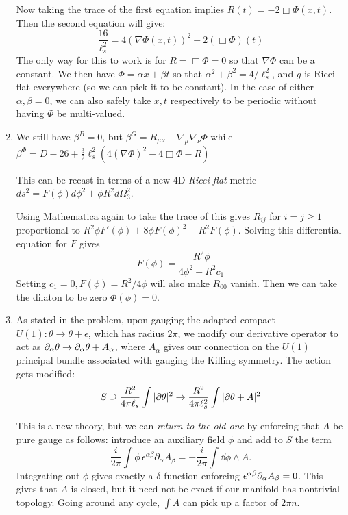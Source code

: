 \documentclass[11pt, class=article, crop=false]{standalone}
\begin{document}
\begin{enumerate}
	Now taking the trace of the first equation implies $R(t) = -2 \Box \Phi(x, t)$. Then the second equation will give:
	\[
		\frac{16}{\ell_s^2} =  4(\nabla \Phi(x, t))^2 - 2 (\Box \Phi)(t)
	\]
	The only way for this to work is for $R= \Box \Phi = 0$ so that $\nabla \Phi$ can be a constant. We then have $\Phi = \alpha x + \beta t$ so that $\alpha^2 + \beta^2 = 4/\ell_s^2$, and $g$ is Ricci flat everywhere (so we can pick it to be constant). In the case of either $\alpha, \beta = 0$, we can also safely take $x, t$ respectively to be periodic without having $\Phi$ be multi-valued.
	
	\item We still have $\beta^B = 0$, but $\beta^{G} = R_{\mu \nu} - \nabla_{\mu} \nabla_{\nu} \Phi$ while $\beta^\Phi = D - 26 +  \frac32 \ell_s^2 ( 4 (\nabla \Phi)^2 - 4 \Box \Phi - R)$
	
	This can be recast in terms of a new 4D \emph{Ricci flat} metric $ds^2 = F(\phi) d\phi^2 + \phi R^2 d\Omega_3^2$. 
	
	Using Mathematica again to take the trace of this gives $R_{ij}$ for $i=j\geq 1$ proportional to $R^2 \phi F'(\phi) + 8 \phi F(\phi)^2 - R^2 F(\phi)$. Solving this differential equation for $F$ gives
	\[
		F(\phi) = \frac{R^2 \phi}{4 \phi^2 + R^2 c_1}
	\]
	Setting $c_1 = 0, F(\phi) = R^2 / 4 \phi$ will also make $R_{00}$ vanish. Then we can take the dilaton to be zero $\Phi(\phi) = 0$.
	
	\item As stated in the problem, upon gauging the adapted compact $U(1): \theta \to \theta + \epsilon$, which has radius $2\pi$, we modify our derivative operator to act as $\partial_\alpha \theta \to \partial_\alpha \theta + A_\alpha$, where $A_\alpha$ gives our connection on the $U(1)$ principal bundle associated with gauging the Killing symmetry. The action gets modified:
	\[
		S \supseteq \frac{R^2}{4\pi \ell_s} \int |\partial \theta|^2 \to \frac{R^2}{4\pi \ell_s^2} \int |\partial \theta + A|^2
	\]
	
	This is a new theory, but we can \emph{return to the old one} by enforcing that $A$ be pure gauge as follows: introduce an auxiliary field $\phi$ and add to $S$ the term 
	\[
		\frac{i}{2\pi} \int \phi\, \epsilon^{\alpha \beta} \partial_{\alpha} A_{\beta} = - \frac{i}{2\pi} \int \dd \phi \wedge A.
	\]
	 Integrating out $\phi$ gives exactly a $\delta$-function enforcing $\epsilon^{\alpha \beta} \partial_\alpha A_{\beta}=0$. This gives that $A$ is closed, but it need not be exact if our manifold has nontrivial topology. Going around any cycle, $\int A$ can pick up a factor of $2 \pi n$. 
	

\end{enumerate}
\end{document}
